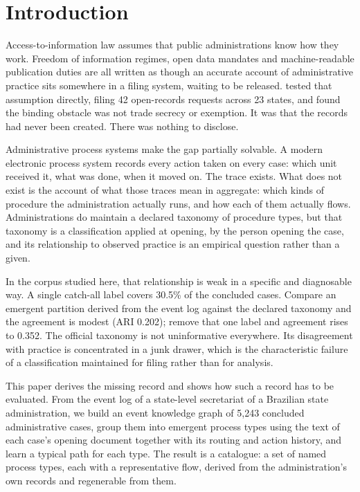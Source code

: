 \section{Introduction}\label{sec:intro}

Access-to-information law assumes that public administrations know how they work. Freedom of
information regimes, open data mandates and machine-readable publication duties are all written
as though an accurate account of administrative practice sits somewhere in a filing system,
waiting to be released. \citet{brauneis2018algorithmic} tested that assumption directly, filing
42 open-records requests across 23 states, and found the binding obstacle was not trade secrecy
or exemption. It was that the records had never been created. There was nothing to disclose.

Administrative process systems make the gap partially solvable. A modern electronic process
system records every action taken on every case: which unit received it, what was done, when it
moved on. The trace exists. What does not exist is the account of what those traces mean in
aggregate: which kinds of procedure the administration actually runs, and how each of them
actually flows. Administrations do maintain a declared taxonomy of procedure types, but that
taxonomy is a classification applied at opening, by the person opening the case, and its
relationship to observed practice is an empirical question rather than a given.

In the corpus studied here, that relationship is weak in a specific and diagnosable way. A
single catch-all label covers 30.5\% of the concluded cases. Compare an emergent partition derived from the
event log against the declared taxonomy and the agreement is modest (ARI 0.202); remove that one
label and agreement rises to 0.352. The official taxonomy is not uninformative everywhere. Its
disagreement with practice is concentrated in a junk drawer, which is the characteristic failure
of a classification maintained for filing rather than for analysis.

This paper derives the missing record and shows how such a record has to be evaluated. From the
event log of a state-level secretariat of a Brazilian state administration, we build an event
knowledge graph of 5{,}243 concluded administrative cases, group them into emergent process
types using the text of each case's opening document together with its routing and action
history, and learn a typical path for each type. The result is a catalogue: a set of named
process types, each with a representative flow, derived from the administration's own records
and regenerable from them.

